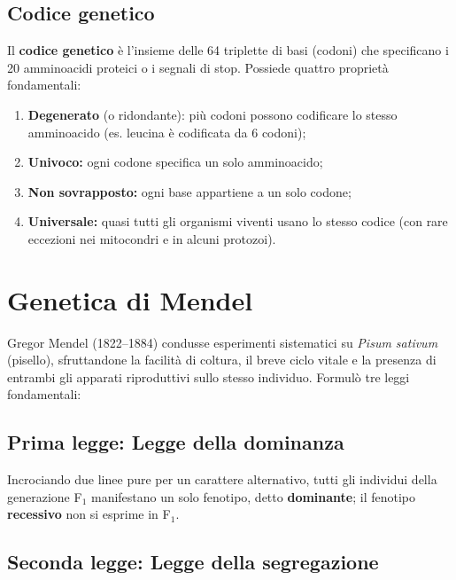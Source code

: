 \documentclass[11pt,a4paper,openright,twoside]{book}
\theoremstyle{definition}
\theoremstyle{plain}
\theoremstyle{remark}
\begin{document}
\subsection{Codice genetico}

Il \textbf{codice genetico} è l'insieme delle 64 triplette di basi (codoni) che specificano i 20 amminoacidi proteici o i segnali di stop. Possiede quattro proprietà fondamentali:

\begin{enumerate}
  \item \textbf{Degenerato} (o ridondante): più codoni possono codificare lo stesso amminoacido (es. leucina è codificata da 6 codoni);
  \item \textbf{Univoco:} ogni codone specifica un solo amminoacido;
  \item \textbf{Non sovrapposto:} ogni base appartiene a un solo codone;
  \item \textbf{Universale:} quasi tutti gli organismi viventi usano lo stesso codice (con rare eccezioni nei mitocondri e in alcuni protozoi).
\end{enumerate}

\section{Genetica di Mendel}

Gregor Mendel (1822--1884) condusse esperimenti sistematici su \textit{Pisum sativum} (pisello), sfruttandone la facilità di coltura, il breve ciclo vitale e la presenza di entrambi gli apparati riproduttivi sullo stesso individuo. Formulò tre leggi fondamentali:

\subsection{Prima legge: Legge della dominanza}

Incrociando due linee pure per un carattere alternativo, tutti gli individui della generazione F$_1$ manifestano un solo fenotipo, detto \textbf{dominante}; il fenotipo \textbf{recessivo} non si esprime in F$_1$.

\subsection{Seconda legge: Legge della segregazione}
\end{document}
